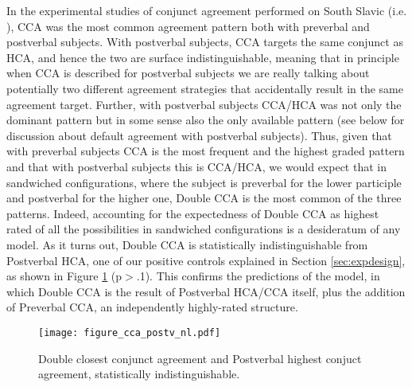 \documentclass[output=paper
,modfonts
,nonflat]{langsci/langscibook}
\begin{document}
In the experimental studies of conjunct agreement performed on South Slavic (i.e. \citealt{marusicnevinsbadecker:15,willergold:16}), CCA was the most common agreement pattern both with preverbal and postverbal subjects. With postverbal subjects, CCA targets the same conjunct as HCA, and hence the two are surface indistinguishable, meaning that in principle when CCA is described for postverbal subjects we are really talking about potentially two different agreement strategies that accidentally result in the same agreement target. Further, with postverbal subjects CCA/HCA was not only the dominant pattern but in some sense also the only available pattern (see below for discussion about default agreement with postverbal subjects). Thus, given that with preverbal subjects CCA is the most frequent and the highest graded pattern and that with postverbal subjects this is CCA/HCA, we would expect that in sandwiched configurations, where the subject is preverbal for the lower participle and postverbal for the higher one, Double CCA is the most common of the three patterns. Indeed, accounting for the expectedness of Double CCA as highest rated of all the possibilities in sandwiched configurations is a desideratum of any model. As it turns out, Double CCA is statistically indistinguishable from Postverbal HCA, one of our positive controls explained in Section \ref{sec:expdesign}, as shown in Figure \ref{fig:figure_cca_postv} (p$>$.1). This confirms the predictions of the model, in which Double CCA is the result of Postverbal HCA/CCA itself, plus the addition of Preverbal CCA, an independently highly-rated structure.

\begin{figure}[h]
\begin{center}
\texttt{[image: figure\_cca\_postv\_nl.pdf]}
\end{center}
\caption{Double closest conjunct agreement and Postverbal highest conjuct agreement, statistically indistinguishable.}
\label{fig:figure_cca_postv}
\end{figure}
\end{document}
